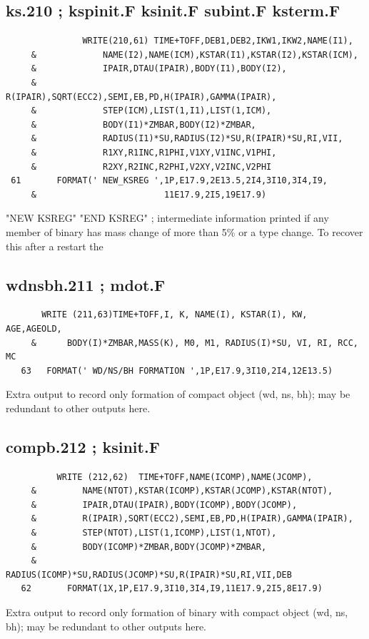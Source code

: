 \subsection{ks.210 ; kspinit.F ksinit.F subint.F ksterm.F }
\begin{verbatim}
               WRITE(210,61) TIME+TOFF,DEB1,DEB2,IKW1,IKW2,NAME(I1),
     &             NAME(I2),NAME(ICM),KSTAR(I1),KSTAR(I2),KSTAR(ICM),
     &             IPAIR,DTAU(IPAIR),BODY(I1),BODY(I2),
     &             R(IPAIR),SQRT(ECC2),SEMI,EB,PD,H(IPAIR),GAMMA(IPAIR),
     &             STEP(ICM),LIST(1,I1),LIST(1,ICM),
     &             BODY(I1)*ZMBAR,BODY(I2)*ZMBAR,
     &             RADIUS(I1)*SU,RADIUS(I2)*SU,R(IPAIR)*SU,RI,VII,
     &             R1XY,R1INC,R1PHI,V1XY,V1INC,V1PHI,
     &             R2XY,R2INC,R2PHI,V2XY,V2INC,V2PHI
 61       FORMAT(' NEW_KSREG ',1P,E17.9,2E13.5,2I4,3I10,3I4,I9,
     &                         11E17.9,2I5,19E17.9)
 \end{verbatim}

 "NEW KSREG" "END KSREG" ; intermediate information printed if any member of binary has mass change of more than 5\% or a type change. To recover this after a restart the 

\subsection{wdnsbh.211 ; mdot.F }
 \begin{verbatim}
       WRITE (211,63)TIME+TOFF,I, K, NAME(I), KSTAR(I), KW, AGE,AGEOLD,
     &      BODY(I)*ZMBAR,MASS(K), M0, M1, RADIUS(I)*SU, VI, RI, RCC, MC
   63   FORMAT(' WD/NS/BH FORMATION ',1P,E17.9,3I10,2I4,12E13.5)
 \end{verbatim}

 Extra output to record only formation of compact object (wd, ns, bh); may be redundant to other outputs here.

\subsection{compb.212 ; ksinit.F }
 \begin{verbatim}
          WRITE (212,62)  TIME+TOFF,NAME(ICOMP),NAME(JCOMP),
     &         NAME(NTOT),KSTAR(ICOMP),KSTAR(JCOMP),KSTAR(NTOT),
     &         IPAIR,DTAU(IPAIR),BODY(ICOMP),BODY(JCOMP),
     &         R(IPAIR),SQRT(ECC2),SEMI,EB,PD,H(IPAIR),GAMMA(IPAIR),
     &         STEP(NTOT),LIST(1,ICOMP),LIST(1,NTOT),
     &         BODY(ICOMP)*ZMBAR,BODY(JCOMP)*ZMBAR,
     &         RADIUS(ICOMP)*SU,RADIUS(JCOMP)*SU,R(IPAIR)*SU,RI,VII,DEB
   62       FORMAT(1X,1P,E17.9,3I10,3I4,I9,11E17.9,2I5,8E17.9)
\end{verbatim}
 Extra output to record only formation of binary with compact object (wd, ns, bh); may be redundant to other outputs here.


